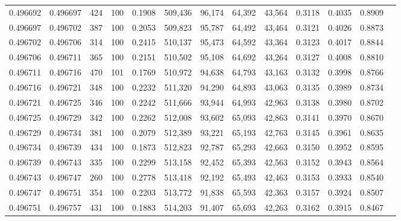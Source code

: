 \begin{tabular}{rrrrrrrrrrrrr}
0.496692 & 0.496697 &   424 & 100 &                                     0.1908 & 509,436 &  96,174 &  64,392 &  43,564 & 0.3118 & 0.4035 & 0.8909 \\
0.496697 & 0.496702 &   387 & 100 &                                     0.2053 & 509,823 &  95,787 &  64,492 &  43,464 & 0.3121 & 0.4026 & 0.8873 \\
0.496702 & 0.496706 &   314 & 100 &                                     0.2415 & 510,137 &  95,473 &  64,592 &  43,364 & 0.3123 & 0.4017 & 0.8844 \\
0.496706 & 0.496711 &   365 & 100 &                                     0.2151 & 510,502 &  95,108 &  64,692 &  43,264 & 0.3127 & 0.4008 & 0.8810 \\
0.496711 & 0.496716 &   470 & 101 &                                     0.1769 & 510,972 &  94,638 &  64,793 &  43,163 & 0.3132 & 0.3998 & 0.8766 \\
0.496716 & 0.496721 &   348 & 100 &                                     0.2232 & 511,320 &  94,290 &  64,893 &  43,063 & 0.3135 & 0.3989 & 0.8734 \\
0.496721 & 0.496725 &   346 & 100 &                                     0.2242 & 511,666 &  93,944 &  64,993 &  42,963 & 0.3138 & 0.3980 & 0.8702 \\
0.496725 & 0.496729 &   342 & 100 &                                     0.2262 & 512,008 &  93,602 &  65,093 &  42,863 & 0.3141 & 0.3970 & 0.8670 \\
0.496729 & 0.496734 &   381 & 100 &                                     0.2079 & 512,389 &  93,221 &  65,193 &  42,763 & 0.3145 & 0.3961 & 0.8635 \\
0.496734 & 0.496739 &   434 & 100 &                                     0.1873 & 512,823 &  92,787 &  65,293 &  42,663 & 0.3150 & 0.3952 & 0.8595 \\
0.496739 & 0.496743 &   335 & 100 &                                     0.2299 & 513,158 &  92,452 &  65,393 &  42,563 & 0.3152 & 0.3943 & 0.8564 \\
0.496743 & 0.496747 &   260 & 100 &                                     0.2778 & 513,418 &  92,192 &  65,493 &  42,463 & 0.3153 & 0.3933 & 0.8540 \\
0.496747 & 0.496751 &   354 & 100 &                                     0.2203 & 513,772 &  91,838 &  65,593 &  42,363 & 0.3157 & 0.3924 & 0.8507 \\
0.496751 & 0.496757 &   431 & 100 &                                     0.1883 & 514,203 &  91,407 &  65,693 &  42,263 & 0.3162 & 0.3915 & 0.8467 \\

\end{tabular}
